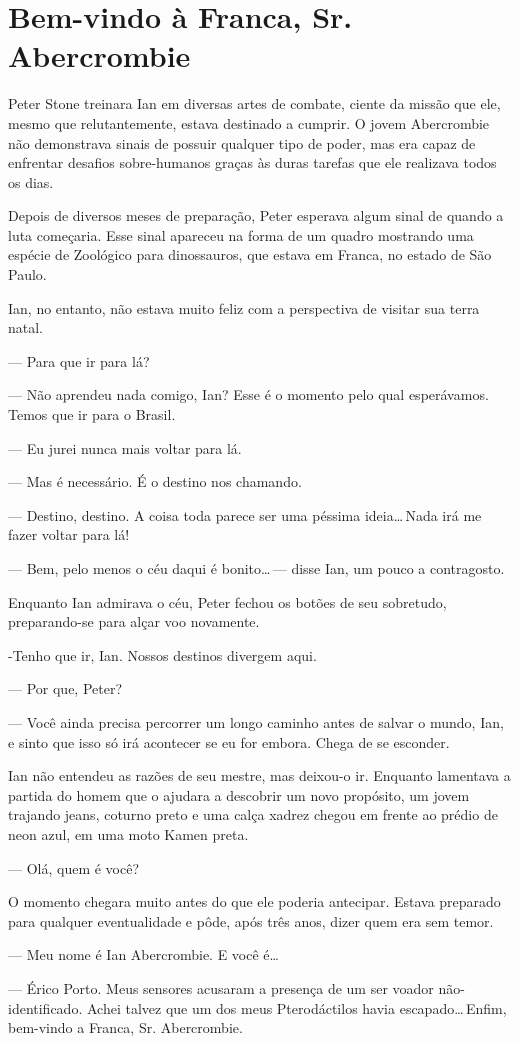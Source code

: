 \chapter{Bem-vindo à Franca, Sr. Abercrombie}

Peter Stone treinara Ian em diversas artes de combate, ciente da missão
que ele, mesmo que relutantemente, estava destinado a cumprir. O jovem
Abercrombie não demonstrava sinais de possuir qualquer tipo de poder,
mas era capaz de enfrentar desafios sobre-humanos graças às duras
tarefas que ele realizava todos os dias.

Depois de diversos meses de preparação, Peter esperava algum sinal de
quando a luta começaria. Esse sinal apareceu na forma de um quadro
mostrando uma espécie de Zoológico para dinossauros, que estava em
Franca, no estado de São Paulo.

Ian, no entanto, não estava muito feliz com a perspectiva de visitar sua
terra natal.

--- Para que ir para lá?

--- Não aprendeu nada comigo, Ian? Esse é o momento pelo qual
esperávamos. Temos que ir para o Brasil.

--- Eu jurei nunca mais voltar para lá.

--- Mas é necessário. É o destino nos chamando.

--- Destino, destino. A coisa toda parece ser uma péssima
ideia\ldots\,Nada irá me fazer voltar para lá!


--- Bem, pelo menos o céu daqui é bonito\ldots\,--- disse Ian, um pouco
a contragosto.

Enquanto Ian admirava o céu, Peter fechou os botões de seu sobretudo,
pre\-pa\-ran\-do-se para alçar voo novamente.

-Tenho que ir, Ian. Nossos destinos divergem aqui.

--- Por que, Peter?

--- Você ainda precisa percorrer um longo caminho antes de salvar o
mundo, Ian, e sinto que isso só irá acontecer se eu for embora. Chega de
se esconder.

Ian não entendeu as razões de seu mestre, mas deixou-o ir. Enquanto
lamentava a partida do homem que o ajudara a descobrir um novo
propósito, um jovem trajando jeans, coturno preto e uma calça xadrez
chegou em frente ao prédio de neon azul, em uma moto Kamen preta.

--- Olá, quem é você?

O momento chegara muito antes do que ele poderia antecipar. Estava
preparado para qualquer eventualidade e pôde, após três anos, dizer quem
era sem temor.

--- Meu nome é Ian Abercrombie. E você é\ldots

--- Érico Porto. Meus sensores acusaram a presença de um ser voador
não-iden\-ti\-fi\-ca\-do. Achei talvez que um dos meus Pterodáctilos havia
escapado\ldots\,Enfim, bem-vindo a Franca, Sr. Abercrombie.
